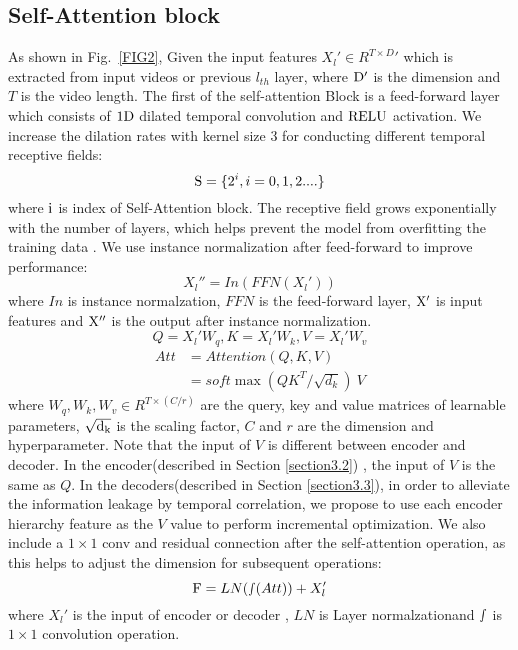 \documentclass[runningheads]{llncs}
\begin{document}
\subsection{Self-Attention block}\label{section3.1}
\par{
	As shown in Fig.~\ref{FIG2}, Given the input features $ X_l'\in {R^{T \times D}}'$ which is extracted from input videos or previous ${l_{th}}$ layer, where ${\rm{D'}}$ is the dimension and $T$ is the video length. The first of the self-attention Block is a feed-forward layer which consists of $1{\rm{D}}$ dilated temporal convolution and ${\rm{RELU}}$ activation. We increase the dilation rates with kernel size $3$ for conducting different temporal receptive fields:
}
\begin{equation}
	{\rm{S}} = \{ {2^i}, i = 0,1,2....\} 
\end{equation}
\noindent where ${\rm{i}}$ is index of Self-Attention block. The receptive field grows exponentially with the number of layers, which helps prevent the model from overfitting the training data \cite{lea2017temporal}. We use instance normalization after feed-forward to improve performance:
\begin{equation}
	X_l{''} = In(FFN({X_l}'))
\end{equation}
\noindent where $ In $ is instance normalzation, $ FFN $ is the feed-forward layer, ${\rm{X'}}$ is input features and ${\rm{X''}}$ is the output after instance normalization.
\begin{equation}
	Q = X_l'{W_q},K = X_l'{W_k},V = X_l'{W_v}
\end{equation}
\begin{equation}
	\begin{aligned}
		Att &= Attention(Q,K,V) \\
		&= soft\max (Q{K^T}/\sqrt {{d_k}})~V
	\end{aligned}
\end{equation}
\noindent where $ {W_q},{W_k},{W_v} \in {R^{T \times (C/r)}} $ are the query, key and value matrices of learnable parameters, $\sqrt {{{\rm{d}}_{\rm{k}}}} $ is the scaling factor, $ C $ and $ r $ are the dimension and hyperparameter. Note that the input of $ V $ is different between encoder and decoder. In the encoder(described in Section \ref{section3.2}) , the input of $ V $ is the same as $ Q $. In the decoders(described in Section \ref{section3.3}), in order to alleviate the information leakage by temporal correlation, we propose to use each encoder hierarchy feature as the $ V $ value to perform incremental optimization. We also include a $1 \times 1$ conv and residual connection after the self-attention operation, as this helps to adjust the dimension for subsequent operations:
\begin{equation}
	{\rm{F}} = LN(\smallint (Att)) + X_l'
\end{equation}
\noindent where $ X_l' $ is the input of encoder or decoder , $ LN $ is Layer normalzationand $\smallint$ is $1 \times 1$ convolution operation.
\end{document}

